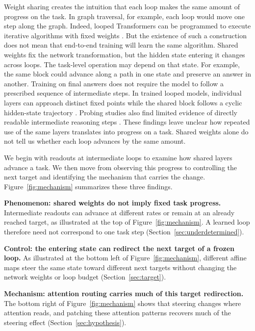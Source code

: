 \documentclass{article}
\begin{document}
Weight sharing creates the intuition that each loop makes the same amount of progress on the task. In graph traversal, for example, each loop would move one step along the graph. Indeed, looped Transformers can be programmed to execute iterative algorithms with fixed weights \citep{giannou2023loops}. But the existence of such a construction does not mean that end-to-end training will learn the same algorithm. Shared weights fix the network transformation, but the hidden state entering it changes across loops. The task-level operation may depend on that state. For example, the same block could advance along a path in one state and preserve an answer in another. Training on final answers does not require the model to follow a prescribed sequence of intermediate steps. In trained looped models, individual layers can approach distinct fixed points while the shared block follows a cyclic hidden-state trajectory \citep{blayney2026mechanistic}. Probing studies also find limited evidence of directly readable intermediate reasoning steps \citep{lu2025probing}. These findings leave unclear how repeated use of the same layers translates into progress on a task. Shared weights alone do not tell us whether each loop advances by the same amount.

We begin with readouts at intermediate loops to examine how shared layers advance a task. We then move from observing this progress to controlling the next target and identifying the mechanism that carries the change. Figure~\ref{fig:mechanism} summarizes these three findings.

\textbf{Phenomenon: shared weights do not imply fixed task progress.} Intermediate readouts can advance at different rates or remain at an already reached target, as illustrated at the top of Figure~\ref{fig:mechanism}. A learned loop therefore need not correspond to one task step (Section~\ref{sec:underdetermined}).

\textbf{Control: the entering state can redirect the next target of a frozen loop.} As illustrated at the bottom left of Figure~\ref{fig:mechanism}, different affine maps steer the same state toward different next targets without changing the network weights or loop budget (Section~\ref{sec:target}).

\textbf{Mechanism: attention routing carries much of this target redirection.} The bottom right of Figure~\ref{fig:mechanism} shows that steering changes where attention reads, and patching these attention patterns recovers much of the steering effect (Section~\ref{sec:hypothesis}).
\end{document}
